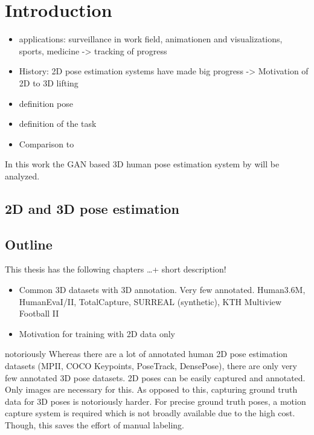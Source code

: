 \section{Introduction}


\begin{itemize}
	\item applications: surveillance in work field, animationen and visualizations, sports, medicine -> tracking of progress
	\item History: 2D pose estimation systems have made big progress -> Motivation of 2D to 3D lifting
	\item definition pose
	\item definition of the task
	\item Comparison to \citet{wandt19}
\end{itemize}

In this work the GAN based 3D human pose estimation system by \citet{drover18} will be analyzed.

\subsection{2D and 3D pose estimation}

\subsection{Outline}
This thesis has the following chapters \dots + short description!


\begin{itemize}
	\item Common 3D datasets with 3D annotation. Very few annotated. Human3.6M, HumanEvaI/II, TotalCapture, SURREAL (synthetic), KTH Multiview Football II
	\item Motivation for training with 2D data only
\end{itemize}

notoriously
Whereas there are a lot of annotated human 2D pose estimation datasets (MPII, COCO Keypoints, PoseTrack, DensePose), there are only very few annotated 3D pose datasets. 
2D poses can be easily captured and annotated.
Only images are necessary for this.
As opposed to this, capturing ground truth data for 3D poses is notoriously harder.
For precise ground truth poses, a motion capture system is required which is not broadly available due to the high cost.
Though, this saves the effort of manual labeling.
